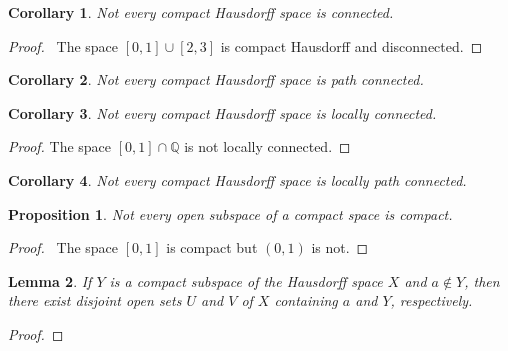 \documentclass{report}
\let\qed\relax
\newtheorem{lm}{Lemma}[section]
\newtheorem{prop}[lm]{Proposition}
\newtheorem{cor}{Corollary}[lm]
\theoremstyle{definition}
\begin{document}
\begin{cor}
  Not every compact Hausdorff space is connected.
\end{cor}

\begin{proof}
  \pf\ The space $[0,1] \cup [2,3]$ is compact Hausdorff and disconnected. \qed
\end{proof}

\begin{cor}
  Not every compact Hausdorff space is path connected.
\end{cor}

\begin{cor}
  Not every compact Hausdorff space is locally connected.
\end{cor}

\begin{proof}
  The space $[0,1] \cap \mathbb{Q}$ is not locally connected.
\end{proof}

\begin{cor}
  Not every compact Hausdorff space is locally path connected.
\end{cor}

\begin{prop}
  Not every open subspace of a compact space is compact.
\end{prop}

\begin{proof}
  \pf\ The space $[0,1]$ is compact but $(0,1)$ is not. \qed
\end{proof}

  \begin{lm}
    \label{lm:topology:compact:regular}
    If $Y$ is a compact subspace of the Hausdorff space $X$ and $a \notin Y$,
    then there exist disjoint open sets $U$ and $V$ of $X$ containing $a$ and
    $Y$,
    respectively.
  \end{lm}

  \begin{proof}
    \pf
    \qed
  \end{proof}
\end{document}
